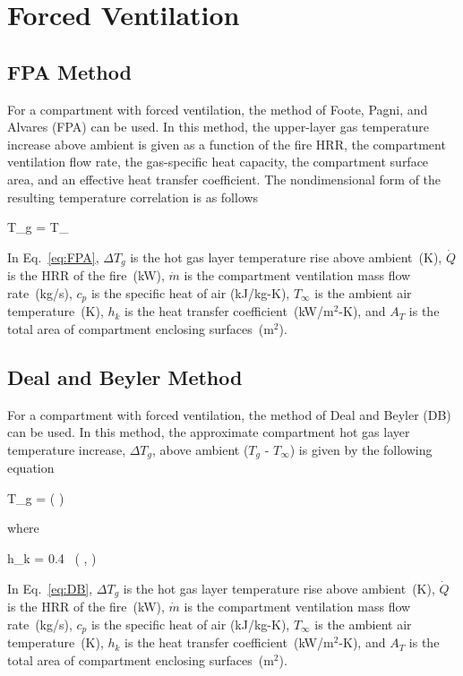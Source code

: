 \clearpage


\section{Forced Ventilation}

\subsection{FPA Method}

For a compartment with forced ventilation, the method of Foote, Pagni, and Alvares (FPA) can be used. In this method, the upper-layer gas temperature increase above ambient is given as a function of the fire HRR, the compartment ventilation flow rate, the gas-specific heat capacity, the compartment surface area, and an effective heat transfer coefficient. The nondimensional form of the resulting temperature correlation is as follows

\be
\Delta T_g =  T_\infty
\label{eq:FPA}
\ee

In Eq.~\ref{eq:FPA}, $\Delta T_g$ is the hot gas layer temperature rise above ambient~(K), $\dot Q$ is the HRR of the fire~(kW), $\dot m$ is the compartment ventilation mass flow rate~(kg/s), $c_p$ is the specific heat of air (kJ/kg-K), $T_\infty$ is the ambient air temperature~(K), $h_k$ is the heat transfer coefficient~(kW/m$^2$-K), and $A_T$ is the total area of compartment enclosing surfaces~(m$^2$).


\subsection{Deal and Beyler Method}

For a compartment with forced ventilation, the method of Deal and Beyler (DB) can be used. In this method, the approximate compartment hot gas layer temperature increase, $\Delta T_g$, above ambient ($T_g$ - $T_\infty$) is given by the following equation

\be
\Delta T_g = \left(  \right)
\label{eq:DB}
\ee

\noindent where

\be
h_k = 0.4\  \left(  ,  \right)
\label{eq:DB_hk}
\ee

In Eq.~\ref{eq:DB}, $\Delta T_g$ is the hot gas layer temperature rise above ambient~(K), $\dot Q$ is the HRR of the fire~(kW), $\dot m$ is the compartment ventilation mass flow rate~(kg/s), $c_p$ is the specific heat of air (kJ/kg-K), $T_\infty$ is the ambient air temperature~(K), $h_k$ is the heat transfer coefficient~(kW/m$^2$-K), and $A_T$ is the total area of compartment enclosing surfaces~(m$^2$).


